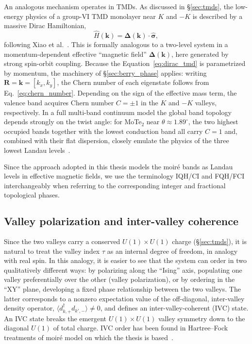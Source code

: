 An analogous mechanism operates in TMDs. As discussed in \S\ref{sec:tmds}, the low-energy physics of a group-VI TMD monolayer near $K$ and $-K$ is described by a massive Dirac Hamiltonian,
\begin{equation}
    \hat{H}(\mathbf{k}) = \mathbf{\Delta}(\mathbf{k}) \cdot \hat{\mathbf{\sigma}},
    \label{eq:dirac_tmd}
\end{equation}
following Xiao et al.~\cite{xiao2012coupled}. This is formally analogous to a two-level system in a momentum-dependent effective ``magnetic field'' $\mathbf{\Delta}(\mathbf{k})$, here generated by strong spin-orbit coupling. Because the Equation~\eqref{eq:dirac_tmd} is parametrized by momentum, the machinery of \S\ref{sec:berry_phase} applies: writing $\mathbf{R} = \mathbf{k} = [k_x, k_y]$, the Chern number of each eigenstate follows from Eq.~\eqref{eq:chern_number}. Depending on the sign of the effective mass term, the valence band acquires Chern number $C = \pm 1$ in the $K$ and $-K$ valleys, respectively. In a full multi-band continuum model the global band topology depends strongly on the twist angle: for MoTe$_2$ near $\theta \approx 1.89^\circ$, the two highest occupied bands together with the lowest conduction band all carry $C=1$ and, combined with their flat dispersion, closely emulate the physics of the three lowest Landau levels~\cite{xu2025multiple, li2025variational}.

Since the approach adopted in this thesis models the moir\'e bands as Landau levels in effective magnetic fields, we use the terminology IQH/CI and FQH/FCI interchangeably when referring to the corresponding integer and fractional topological phases.

\subsection{Valley polarization and inter-valley coherence}

Since the two valleys carry a conserved $U(1) \times U(1)$ charge (\S\ref{sec:tmds}), it is
natural to treat the valley index $\tau$ as an internal degree of freedom,
in analogy with real spin. In this analogy, it is easier to see that the system can order in two
qualitatively different ways: by polarizing along the ``Ising'' axis, populating one
valley preferentially over the other (valley polarization), or by
ordering in the ``XY'' plane, developing a fixed phase relationship between the two
valleys. The latter corresponds to a nonzero expectation value of the off-diagonal,
inter-valley density operator, $\langle d^\dagger_{k,+} d_{k',-} \rangle \neq 0$, and
defines an inter-valley-coherent (IVC) state. An IVC state breaks the emergent $U(1) \times U(1)$ valley symmetry down to the diagonal $U(1)$ of total charge. IVC order has been found in Hartree--Fock treatments of moir\'e model on which the thesis is based~\cite{kwan2025textured}. %

